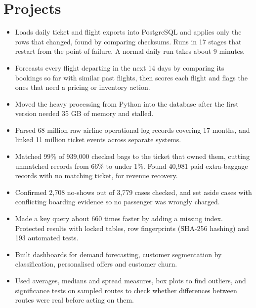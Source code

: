 \section{Projects}
\begin{itemize}
  \item Loads daily ticket and flight exports into PostgreSQL and applies only the rows that changed, found by comparing checksums. Runs in 17 stages that restart from the point of failure. A normal daily run takes about 9 minutes.
  \item Forecasts every flight departing in the next 14 days by comparing its bookings so far with similar past flights, then scores each flight and flags the ones that need a pricing or inventory action.
  \item Moved the heavy processing from Python into the database after the first version needed 35 GB of memory and stalled.
\end{itemize}

\begin{itemize}
  \item Parsed 68 million raw airline operational log records covering 17 months, and linked 11 million ticket events across separate systems.
  \item Matched 99\% of 939,000 checked bags to the ticket that owned them, cutting unmatched records from 66\% to under 1\%. Found 40,981 paid extra-baggage records with no matching ticket, for revenue recovery.
  \item Confirmed 2,708 no-shows out of 3,779 cases checked, and set aside cases with conflicting boarding evidence so no passenger was wrongly charged.
  \item Made a key query about 660 times faster by adding a missing index. Protected results with locked tables, row fingerprints (SHA-256 hashing) and 193 automated tests.
\end{itemize}

\begin{itemize}
  \item Built dashboards for demand forecasting, customer segmentation by classification, personalised offers and customer churn.
  \item Used averages, medians and spread measures, box plots to find outliers, and significance tests on sampled routes to check whether differences between routes were real before acting on them.
\end{itemize}

